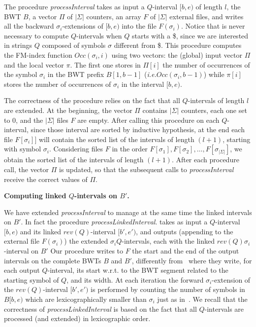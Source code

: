 \documentclass[runningheads,envcountsame,a4paper]{llncs}
\newcommand{\notaestesa}[2]{%
 \marginpar{\color{red!75!black}\textbf{\texttimes}}%
 {\color{red!75!black}%
 [\,\textbullet\,\textsf{\textbf{#1:}} %
 \textsf{\footnotesize#2}\,\textbullet\,]}%
}
\newcommand{\ie}{\textit{i.e.}\xspace}
\newcommand{\wrt}{w.r.t.\xspace}
\begin{document}
The procedure \emph{processInterval} takes as input a $Q$-interval $[b,e)$ of
length $l$, the BWT $B$, a vector $\Pi$ of $|\Sigma|$ counters, an array $F$ of
$|\Sigma|$ external files, and writes all the backward $\sigma_i$-extensions of
$[b,e)$ into the file $F(\sigma_{i})$.
Notice that is never necessary to compute $Q$-intervals when $Q$ starts with a \$, since we are interested in strings $Q$ composed of symbols $\sigma$ different from \$.
This procedure computes the FM-index function $Occ(\sigma_i, i)$ using two
vectors: the (global) input vector $\Pi$ and the local vector $\pi$.
The first one stores in $\Pi[i]$ the number of occurrences of  the symbol
$\sigma_i$ in the BWT prefix $B[1,b-1]$ (\ie $Occ(\sigma_{i}, b-1)$) while
$\pi[i]$ stores the number of occurrences of $\sigma_i$ in the interval $[b,e)$.

The correctness of the procedure relies on the fact that all $Q$-intervals of
length $l$ are extended.
At the beginning, the vector $\Pi$ contains $|\Sigma|$ counters, each one set to $0$, and the $|\Sigma|$ files $F$ are empty.
After calling this procedure on each $Q$-interval, since those interval are
sorted by inductive hypothesis,  at the end each file $F[\sigma_{i}]]$ will
contain the sorted list of the intervals of length $(l+1)$, starting with symbol
$\sigma_i$.
Considering files $F$ in the order $F[\sigma_{1}], F[\sigma_{2}], \ldots
,F[\sigma_{|\Sigma|}]$, we obtain the sorted list of the intervals of length
$(l+1)$.
After each procedure call, the vector $\Pi$ is updated, so that the subsequent
calls to \emph{processInterval} receive the correct values of $\Pi$.

\noindent
{\bf Computing  linked $Q$-intervals on $B'$.}

We have extended \emph{processInterval} to manage at the same time  the linked intervals on
$B'$.
In fact the procedure \emph{processLinkedInterval}.
takes as input a $Q$-interval $[b,e)$ and its linked
$rev(Q)$-interval $[b',e')$, and outputs (appending to the external file $F(\sigma_{i})$)
the extended $\sigma_i Q$-intervals, each  with the linked $rev(Q)
\sigma_i$-interval on $B'$
Our procedure writes to $F$ the start and the end of the output intervals on the
complete BWTs $B$ and $B'$, differently from~\cite{Cox2012} where they write, for each output $Q$-interval, its start \wrt to the BWT segment related to the starting symbol of $Q$, and its width.
At each iteration the forward $\sigma_i$-extension
of the $rev(Q)$-interval $[b',e')$ is performed by counting
the number of symbols in $B[b,e)$ which are lexicographically smaller than
$\sigma_i$ just as in~\cite{Simpson2010}.
We recall that the correctness of \emph{processLinkedInterval} is based on the
fact that all $Q$-intervals are processed (and extended) in lexicographic order.
\end{document}
